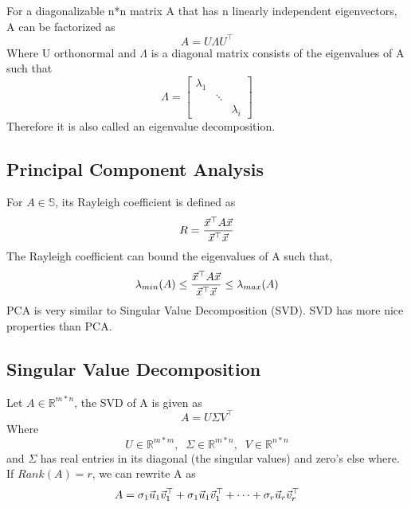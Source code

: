 \begin{remark}
	For a diagonalizable n*n matrix A that has n linearly independent eigenvectors, A can be factorized as
	\[
A = U\Lambda U^\top
	\]
	Where U orthonormal and $\Lambda$ is a diagonal matrix consists of the eigenvalues of A such that
	\[
\Lambda = \begin{bmatrix}
	\lambda_1 & & \\
	& \ddots & \\
	& & \lambda_i
\end{bmatrix}
	\]
	Therefore it is also called an eigenvalue decomposition.
\end{remark}


\subsection{Principal Component Analysis} %
\label{sub:principal_component_analysis}

\begin{definition}
	For $A\in\mathbb{S}$, its Rayleigh coefficient is defined as
	\[
R = \frac{\vec{x}^\top A\vec{x}}{\vec{x}^\top\vec{x}}
	\]
	The Rayleigh coefficient can bound the eigenvalues of A such that,
	\[
\lambda_{min}(A) \le \frac{\vec{x}^\top A\vec{x}}{\vec{x}^\top\vec{x}} \le \lambda_{max}(A)
	\]
	PCA is very similar to Singular Value Decomposition (SVD). SVD has more nice properties than PCA.
\end{definition}



\subsection{Singular Value Decomposition} %
\label{sub:singular_value_decomposition}

\begin{theorem}[SVD]
	Let $A \in \mathbb{R}^{m*n}$, the SVD of A is given as
	\[
A = U \Sigma V^\top
	\]
	Where
	\[
	U\in\mathbb{R}^{m*m},\;\; \Sigma\in\mathbb{R}^{m*n},\;\;V\in\mathbb{R}^{n*n}
	\]
	and $\Sigma$ has real entries in its diagonal (the singular values) and zero's else where.
	If $Rank(A)=r$, we can rewrite A as
	\[
A = \sigma_1\vec{u}_1\vec{v}^\top_1 + \sigma_1\vec{u}_1\vec{v}^\top_1 + \cdots + \sigma_r\vec{u}_r\vec{v}^\top_r
	\]
\end{theorem}

